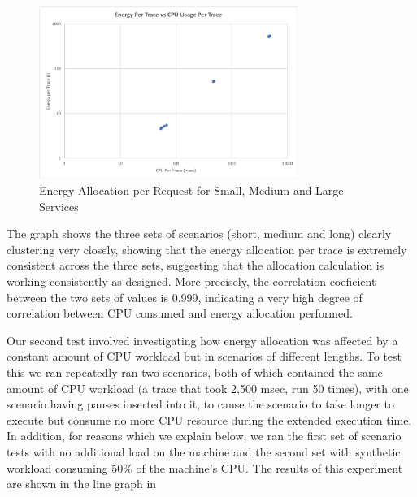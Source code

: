 \begin{figure}
\centering
\includegraphics[width=0.75\textwidth,trim={3 3 3 3},clip]{Figures/validation-energycpu}
\caption{Energy Allocation per Request for Small, Medium and Large Services}
\label{figure:validation-energycpu}
\end{figure}

The graph shows the three sets of scenarios (short, medium and long) clearly clustering very closely, showing that the energy allocation per trace is extremely consistent across the three sets, suggesting that the allocation calculation is working consistently as designed.  More precisely, the correlation coeficient between the two sets of values is 0.999, indicating a very high degree of correlation between CPU consumed and energy allocation performed.

Our second test involved investigating how energy allocation was affected by a constant amount of CPU workload but in scenarios of different lengths.  To test this we ran repeatedly ran two scenarios, both of which contained the same amount of CPU workload (a trace that took 2,500 msec, run 50 times), with one scenario having pauses inserted into it, to cause the scenario to take longer to execute but consume no more CPU resource during the extended execution time.  In addition, for reasons which we explain below, we ran the first set of scenario tests with no additional load on the machine and the second set with synthetic workload consuming 50\% of the machine's CPU.  The results of this experiment are shown in the line graph in 

